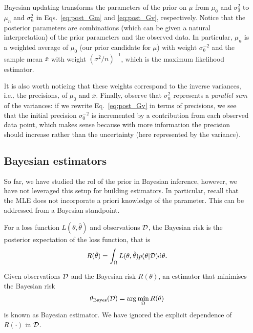 \begin{remark}
Bayesian updating transforms the parameters of the prior on $\mu$ from $\mu_0$ and $\sigma_0^2$ to $\mu_n$ and $\sigma_n^2$ in Eqs.~\eqref{eq:post_Gm} and \eqref{eq:post_Gv}, respectively. Notice that the posterior parameters are combinations (which can be given a natural interpretation) of the prior parameters and the observed data. In particular, $\mu_n$ is a weighted average of $\mu_0$ (our prior candidate for $\mu$) with weight $\sigma_0^{-2}$ and the sample mean $\bar{x}$ with weight $(\sigma^2/n)^{-1}$, which is the maximum likelihood estimator. 

It is also worth noticing that these weights correspond to the inverse variances, i.e., the precisions, of $\mu_0$ and $\bar{x}$. Finally, observe that $\sigma_n^2$ represents a \emph{parallel sum} of the variances: if we rewrite Eq.~\eqref{eq:post_Gv} in terms of precisions, we see that the initial precision $\sigma_0^{-2}$ is incremented by a contribution from each observed data point, which makes sense because with more information the precision should increase rather than the uncertainty (here represented by the variance).
\end{remark}


\subsection{Bayesian estimators}

So far, we have studied the rol of the prior in Bayesian inference, however, we have not leveraged this setup for building estimators. In particular, recall that the MLE does not incorporate a priori knowledge of the parameter. This can be addressed from a Bayesian standpoint.

\begin{definition}
For a loss function $L(\theta,\hat\theta)$ and observations ${\mathcal D}$, the Bayesian risk is the posterior expectation of the loss function, that is
\begin{equation}
    R(\hat\theta) = \int_\Omega L(\theta,\hat\theta)p(\theta|{\mathcal D}){\text d}\theta.
\end{equation}
\end{definition}



\begin{definition}
Given observations ${\mathcal D}$ and the Bayesian risk $R(\theta)$, an estimator that minimises the Bayesian risk 
\begin{equation}
    \theta_\text{Bayes}({\mathcal D}) = \arg\min_{\Omega} R(\theta)
\end{equation}
is known as Bayesian estimator. We have ignored the explicit dependence of $R(\cdot)$ in ${\mathcal D}$.
\end{definition}

